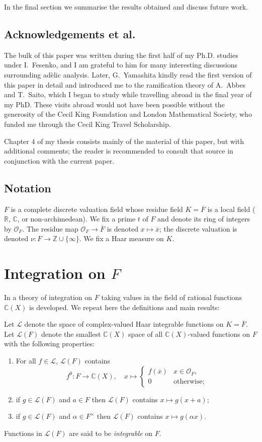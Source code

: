 \documentclass{lmsMODIFIED}
\newcommand{\bb}[1]{\mathbb{#1}}
\renewcommand{\cal}[1]{\mathcal{#1}}
\newcommand{\roi}{\mathcal{O}}
\newcommand{\res}[1]{\overline{#1}}
\newcommand{\al}{\alpha}
\newcommand{\mult}[1]{#1^{\times}}
\begin{document}
In the final section we summarise the results obtained and discuss future work.

\subsection{Acknowledgements et al.}
The bulk of this paper was written during the first half of my Ph.D. studies under I.~Fesenko, and I am grateful to him for many interesting discussions surrounding ad\`elic analysis. Later, G.~Yamashita kindly read the first version of this paper in detail and introduced me to the ramification theory of A.~Abbes and T.~Saito, which I began to study while travelling abroad in the final year of my PhD. These visits abroad would not have been possible without the generosity of the Cecil King Foundation and London Mathematical Society, who funded me through the Cecil King Travel Scholarship. 

Chapter $4$ of my thesis \cite{Morrow_thesis} consists mainly of the material of this paper, but with additional comments; the reader is recommended to consult that source in conjunction with the current paper.

\subsection{Notation}
$F$ is a complete discrete valuation field whose residue field $K=\res{F}$ is a local field ($\bb{R}$, $\bb{C}$, or non-archimedean). We fix a prime $t$ of $F$ and denote its ring of integers by $\roi_{F}$. The residue map $\roi_{F}\to\res{F}$ is denoted $x\mapsto\res{x}$; the discrete valuation is denoted $\nu:F\to\bb{Z}\cup\{\infty\}$. We fix a Haar measure on $K$.

\section{Integration on $F$}
In \cite{Morrow2008} a theory of integration on $F$ taking values in the field of rational functions $\bb{C}(X)$ is developed. We repeat here the definitions and main results:

\begin{definition}
Let $\cal{L}$ denote the space of complex-valued Haar integrable functions on $K=\res{F}$. Let $\cal{L}(F)$ denote the smallest $\bb{C}(X)$ space of all $\bb{C}(X)$-valued functions on $F$ with the following properties:
\begin{enumerate}
\item For all $f\in\cal{L}$, $\cal{L}(F)$ contains
\[f^0:F\to \bb{C}(X),\quad x\mapsto \begin{cases}
	f(\res{x}) & x\in\roi_{F},\\
	0 & \mbox{otherwise;}
	\end{cases}
\]
\item if $g\in\cal{L}(F)$ and $a\in F$ then $\cal{L}(F)$ contains $x\mapsto g(x+a)$;
\item if $g\in\cal{L}(F)$ and $\al\in\mult{F}$ then $\cal{L}(F)$ contains $x\mapsto g(\al x)$.
\end{enumerate}
Functions in $\cal{L}(F)$ are said to be \emph{integrable} on $F$. 
\end{definition}
\end{document}
